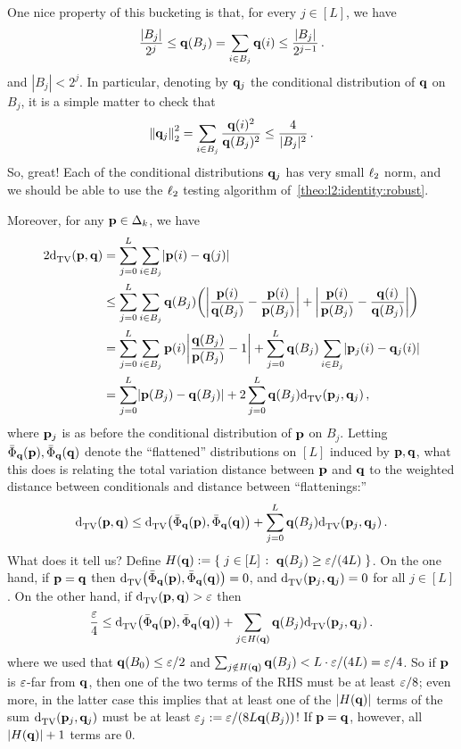 One nice property of this bucketing is that, for every $j\in[L]$, we have
 \begin{equation}
 \label{eq:bucketing:bucketsize}
 	\frac{|B_j|}{2^{j}}  \leq \q(B_j) = \sum_{i\in B_j} \q(i) \leq \frac{|B_j|}{2^{j-1}}\,.
 \end{equation}
 and $|B_j| < 2^j$.
 In particular, denoting by $\q_j$ the conditional distribution of $\q$ on $B_j$, it is a simple matter to check that
\begin{equation}
 \label{eq:bucketing:l2norm}
 		\normtwo{\q_j}^2 = \sum_{i\in B_j} \frac{\q(i)^2}{\q(B_j)^2} \leq \frac{4}{|B_j|^2}\,.
\end{equation}
So, great! Each of the conditional distributions $\q_j$ has very small $\lp[2]$ norm, and we should be able to use the $\lp[2]$ testing algorithm of~\cref{theo:l2:identity:robust}.
 
Moreover, for any $\p\in\distribs{\ab}$, we have
 \begin{align*}
 	2\totalvardist{\p}{\q} 
 	&= \sum_{j=0}^{L} \sum_{i\in B_j} \abs{\p(i)-\q(j)} \\
 	&\leq \sum_{j=0}^{L} \sum_{i\in B_j} \q(B_j)\Paren{ \abs{\frac{\p(i)}{\q(B_j)} - \frac{\p(i)}{\p(B_j)}}+\abs{\frac{\p(i)}{\p(B_j)} - \frac{\q(i)}{\q(B_j)}} }\\
 	&= \sum_{j=0}^{L} \sum_{i\in B_j} \p(i)\abs{\frac{\q(B_j)}{\p(B_j)} - 1}+\sum_{j=0}^{L} \q(B_j) \sum_{i\in B_j}\abs{\p_j(i)-\q_j(i)} \\
 	&= \sum_{j=0}^{L} \abs{\p(B_j) - \q(B_j)} + 2\sum_{j=0}^{L} \q(B_j) \totalvardist{\p_j}{\q_j} \,,
 \end{align*}
 where $\p_j$ is as before the conditional distribution of $\p$ on $B_j$. Letting $\bar{\Phi}_\q(\p),\bar{\Phi}_\q(\q)$ denote the ``flattened'' distributions on $[L]$ induced by $\p,\q$, what this does is relating the total variation distance between $\p$ and $\q$ to the weighted distance between conditionals and distance between ``flattenings:''
 \begin{equation}
 	\totalvardist{\p}{\q}  \leq \totalvardist{\bar{\Phi}_\q(\p)}{\bar{\Phi}_\q(\q)} +\sum_{j=0}^{L} \q(B_j) \totalvardist{\p_j}{\q_j}\,.
 \end{equation}
 What does it tell us? Define $H(\q) \eqdef \setOfSuchThat{j \in[L] }{ \q(B_j) \geq \dst/(4L)}$. On the one hand, if $\p=\q$ then $\totalvardist{\bar{\Phi}_\q(\p)}{\bar{\Phi}_\q(\q)}=0$, and $\totalvardist{\p_j}{\q_j}=0$ for all $j\in[L]$. On the other hand, if $\totalvardist{\p}{\q}>\dst$ then
 \begin{equation}
 	\frac{\dst}{4}  \leq \totalvardist{\bar{\Phi}_\q(\p)}{\bar{\Phi}_\q(\q)} +\sum_{j\in H(\q)}\q(B_j) \totalvardist{\p_j}{\q_j}\,.
 \end{equation}
 where we used that $\q(B_{0}) \leq \dst/2$ and $\sum_{j\notin H(\q)}\q(B_j) < L\cdot \dst/(4L) = \dst/4$. So if $\p$ is $\dst$-far from $\q$, then one of the two terms of the RHS must be at least $\dst/8$; even more, in the latter case this implies that at least one of the $|H(\q)|$ terms of the sum $\totalvardist{\p_j}{\q_j}$ must be at least $\dst_j \eqdef \dst/(8L\q(B_j))$! If $\p=\q$, however, all $|H(\q)|+1$ terms are $0$.
 
